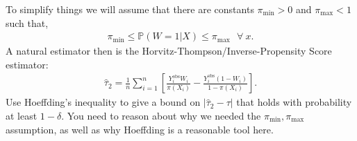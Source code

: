 \documentclass[12pt]{article}
\begin{document}
\begin{enumerate}
To simplify things we will assume that there are constants $\pi_{\min} > 0$ and $\pi_{\max} < 1$ such that,
\begin{align*}
\pi_{\min} \leq \mathbb{P}(W = 1 | X) \leq \pi_{\max}~~~\forall~x.
\end{align*}
A natural estimator then is the Horvitz-Thompson/Inverse-Propensity Score estimator:
\begin{align*}
\widehat{\tau}_2 = \frac{1}{n}  \sum_{i=1}^n \left[\frac{Y_i^{\text{obs}} W_i}{\pi(X_i)} - \frac{Y_i^{\text{obs}} (1-W_i)}{1 - \pi(X_i)} \right].
\end{align*}
Use Hoeffding's inequality to give a bound on $|\widehat{\tau}_2 - \tau|$ that holds with probability at least $1 - \delta$. You need to reason about why we needed the $\pi_{\min}, \pi_{\max}$ assumption, as well as why Hoeffding is a reasonable tool here. 

\end{enumerate}
\end{document}
